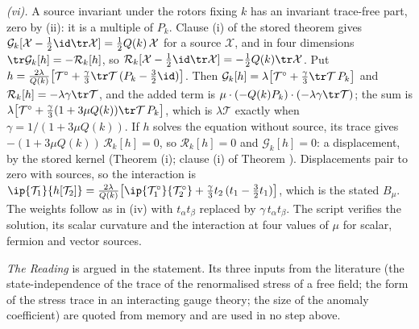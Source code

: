 \emph{(vi).} A source invariant under the rotors fixing $k$ has an invariant trace-free part, zero by (ii): it is a multiple of $P_{k}$. Clause (i) of the stored theorem gives $\mathcal{G}_{k}[\mathcal{X} - \tfrac12\id\tr\mathcal{X}] = \tfrac12 Q(k)\,\mathcal{X}$ for a source $\mathcal{X}$, and in four dimensions $\tr\mathcal{G}_{k}[h] = -\mathcal{R}_{k}[h]$, so $\mathcal{R}_{k}[\mathcal{X} - \tfrac12\id\tr\mathcal{X}] = -\tfrac12 Q(k)\tr\mathcal{X}$. Put $h = \tfrac{2\lambda}{Q(k)}\bigl[\mathcal{T}^{\circ} + \tfrac{\gamma}{3}\tr\mathcal{T}\,(P_{k} - \tfrac32\id)\bigr]$. Then $\mathcal{G}_{k}[h] = \lambda\bigl[\mathcal{T}^{\circ} + \tfrac{\gamma}{3}\tr\mathcal{T}\,P_{k}\bigr]$ and $\mathcal{R}_{k}[h] = -\lambda\gamma\tr\mathcal{T}$, and the added term is $\mu \cdot (-Q(k)P_{k}) \cdot (-\lambda\gamma\tr\mathcal{T})$; the sum is $\lambda\bigl[\mathcal{T}^{\circ} + \tfrac{\gamma}{3}(1 + 3\mu Q(k))\tr\mathcal{T}\,P_{k}\bigr]$, which is $\lambda\mathcal{T}$ exactly when $\gamma = 1/(1 + 3\mu Q(k))$. If $h$ solves the equation without source, its trace gives $-(1 + 3\mu Q(k))\,\mathcal{R}_{k}[h] = 0$, so $\mathcal{R}_{k}[h] = 0$ and $\mathcal{G}_{k}[h] = 0$: a displacement, by the stored kernel (Theorem (i); clause (i) of Theorem ). Displacements pair to zero with sources, so the interaction is $\ip{\mathcal{T}_{1}}{h[\mathcal{T}_{2}]} = \tfrac{2\lambda}{Q(k)}\bigl[\ip{\mathcal{T}_{1}^{\circ}}{\mathcal{T}_{2}^{\circ}} + \tfrac{\gamma}{3}t_{2}\,(t_{1} - \tfrac32 t_{1})\bigr]$, which is the stated $B_{\mu}$. The weights follow as in (iv) with $t_{\alpha}t_{\beta}$ replaced by $\gamma\,t_{\alpha}t_{\beta}$. The script verifies the solution, its scalar curvature and the interaction at four values of $\mu$ for scalar, fermion and vector sources.

\emph{The Reading} is argued in the statement. Its three inputs from the literature (the state-independence of the trace of the renormalised stress of a free field; the form of the stress trace in an interacting gauge theory; the size of the anomaly coefficient) are quoted from memory and are used in no step above.
